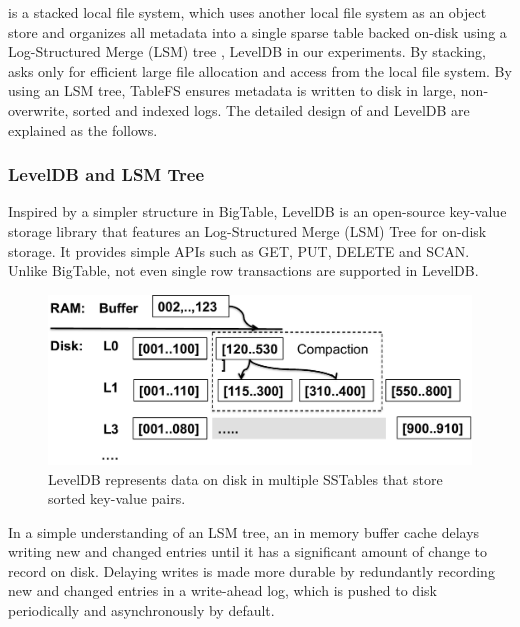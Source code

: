 
\tfs \cite{TableFS} is a stacked local file system, 
which uses another local file system as an object store 
and organizes all metadata into a single sparse table backed on-disk 
using a Log-Structured Merge (LSM) tree \cite{ONeil1996}, LevelDB\cite{LevelDB} in our experiments.
By stacking, \tfs asks only for efficient large file allocation and access from the local file system.
By using an LSM tree, TableFS ensures metadata is written to disk in large, non-overwrite, sorted and indexed logs.
The detailed design of  \tfs and LevelDB are explained as the follows.

\subsubsection*{LevelDB and LSM Tree}
Inspired by a simpler structure in BigTable\citep{BigTable}, 
LevelDB \citep{LevelDB} is an open-source key-value storage library
that features an Log-Structured Merge (LSM) Tree \citep{ONeil1996} for on-disk storage.
It provides simple APIs such as GET, PUT, DELETE and SCAN.
Unlike BigTable, not even single row transactions are supported in LevelDB. 

\begin{figure}[!ht]
\centering
\includegraphics[scale=0.4]{figs/leveldb}
\caption{LevelDB represents data on disk in multiple SSTables that store sorted key-value pairs.}
\label{fig:leveldb}
\end{figure}

In a simple understanding of an LSM tree, an in memory buffer cache delays writing new and changed entries until it has a significant amount of change to record on disk. Delaying writes is made more durable by redundantly recording new and changed entries in a write-ahead log, which is pushed to disk periodically and asynchronously by default.

